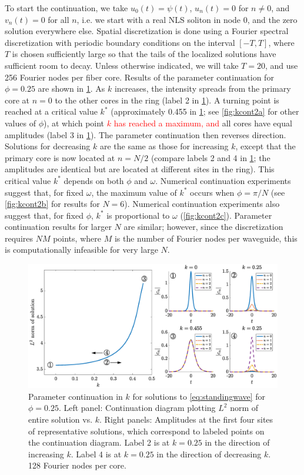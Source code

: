 \documentclass[11pt,reqno]{amsart}
\newcommand{\revised}[1]{ \textcolor{red}{#1} }
\begin{document}
To start the continuation, we take $u_0(t) = \psi(t)$, $u_n(t) = 0$ for $n \neq 0$, and $v_n(t) = 0$ for all $n$, i.e. we start with a real NLS soliton in node 0, and the zero solution everywhere else. Spatial discretization is done using a Fourier spectral discretization with periodic boundary conditions on the interval $[-T,T]$, where $T$ is chosen sufficiently large so that the tails of the localized solutions have sufficient room to decay. Unless otherwise indicated, we will take $T=20$, and use 256 Fourier nodes per fiber core. Results of the parameter continuation for $\phi = 0.25$ are shown in \cref{fig:kcont}. As $k$ increases, the intensity spreads from the primary core at $n=0$ to the other cores in the ring (label 2 in \cref{fig:kcont}). A turning point is reached at a critical value $k^*$ (approximately 0.455 in \cref{fig:kcont}; see \cref{fig:kcont2a} for other values of $\phi$), at which point 
\revised{$k$ has reached a maximum, and}
all cores have equal amplitudes (label 3 in \cref{fig:kcont}). The parameter continuation then reverses direction. Solutions for decreasing $k$ are the same as those for increasing $k$, except that the primary core is now located at $n=N/2$ (compare labels 2 and 4 in \cref{fig:kcont}; the amplitudes are identical but are located at different sites in the ring). This critical value $k^*$ depends on both $\phi$ and $\omega$. Numerical continuation experiments suggest that, for fixed $\omega$, the maximum value of $k^*$ occurs when $\phi = \pi/N$ (see \cref{fig:kcont2b} for results for $N=6$). Numerical continuation experiments also suggest that, for fixed $\phi$, $k^*$ is proportional to $\omega$ (\cref{fig:kcont2c}). Parameter continuation results for larger $N$ are similar; however, since the discretization requires $NM$ points, where $M$ is the number of Fourier nodes per waveguide, this is computationally infeasible for very large $N$.

\begin{figure}
    \centering
    \includegraphics[width=16cm]{contdiag.eps}
    \caption{Parameter continuation in $k$ for solutions to \cref{eq:standingwave} for $\phi=0.25$. Left panel: Continuation diagram plotting $L^2$ norm of entire solution vs. $k$. Right panels: Amplitudes at the first four sites of representative solutions, which correspond to labeled points on the continuation diagram. Label 2 is at $k=0.25$ in the direction of increasing $k$. Label 4 is at $k=0.25$ in the direction of decreasing $k$. 128 Fourier nodes per core.}
    \label{fig:kcont}
\end{figure}
\end{document}
